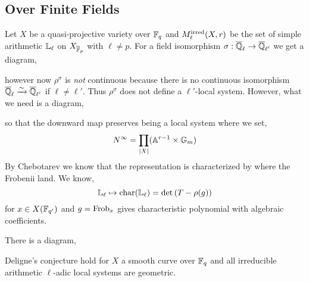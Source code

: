 \documentclass[12pt]{article}
\begin{document}
\subsection{Over Finite Fields}

Let $X$ be a quasi-projective variety over $\mathbb{F}_q$ and $M^{\mathrm{irred}}_\ell(X,r)$ be the set of simple arithmetic $\mathbb{L}_{\ell}$ on $X_{\overline{\mathbb{F}}_p}$ with $\ell \neq p$. For a field isomorphism $\sigma : \overline{\mathbb{Q}}_{\ell} \to \overline{\mathbb{Q}}_{\ell'}$ we get a diagram,
\begin{center}
\end{center}
however now $\rho^{\sigma}$ is \textit{not} continuous because there is no continuous isomorphism $\overline{\mathbb{Q}}_{\ell} \xrightarrow{\sim} \overline{\mathbb{Q}}_{\ell'}$ if $\ell \neq \ell'$. Thus $\rho^{\sigma}$ does not define a $\ell'$-local system. However, what we need is a diagram,
\begin{center}
\end{center}
so that the downward map preserves being a local system where we set,
\[ N^\infty = \prod_{|X|} (\mathbb{A}^{r-1} \times \mathbb{G}_m) \]
By Chebotarev we know that the representation is characterized by where the Frobenii land. We know,
\[ \mathbb{L}_{\ell} \mapsto \mathrm{char}(\mathbb{L}_\ell) = \det{(T - \rho(g))} \]
for $x \in X(\mathbb{F}_{q'})$ and $g = \mathrm{Frob}_x$ gives characteristic polynomial with algebraic coefficients.

\begin{conj}
There is a diagram,
\begin{center}
\end{center}
\end{conj}

\begin{theorem}[Lafforge]
Deligne's conjecture hold for $X$ a smooth curve over $\mathbb{F}_q$ and all irreducible arithmetic $\ell$-adic local systems are geometric.
\end{theorem}
\end{document}
